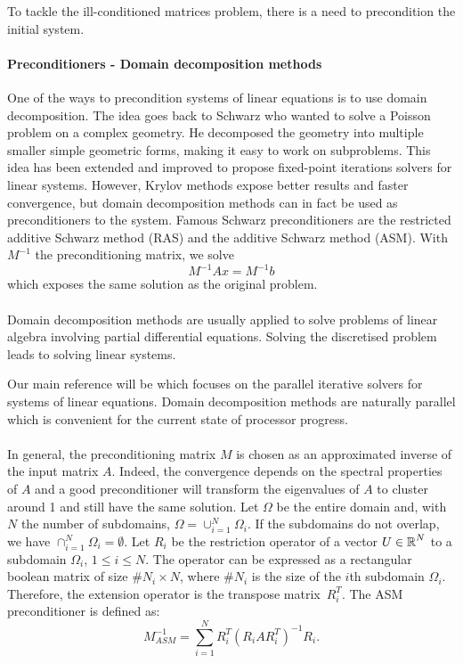 To tackle the ill-conditioned matrices problem, there is a need to precondition the initial system.


\paragraph{Preconditioners - Domain decomposition methods}
One of the ways to precondition systems of linear equations is to use domain decomposition.
The idea goes back to Schwarz \cite{schwarz_grenzuebegang_1870} who wanted to solve a Poisson problem on a complex geometry.
He decomposed the geometry into multiple smaller simple geometric forms, making it easy to work on subproblems.
This idea has been extended and improved to propose fixed-point iterations solvers for linear systems.
However, Krylov methods expose better results and faster convergence, but domain decomposition methods can in fact be used as preconditioners to the system.
Famous Schwarz preconditioners are the restricted additive Schwarz method (RAS) and the additive Schwarz method (ASM).
With \(M^{-1}\) the preconditioning matrix, we solve
\[M^{-1}Ax = M^{-1}b\]
which exposes the same solution as the original problem.

\paragraph{}
Domain decomposition methods are usually applied to solve problems of linear algebra involving partial differential equations.
Solving the discretised problem leads to solving linear systems.

Our main reference will be \cite{dolean_domain_2015} which focuses on the parallel iterative solvers for systems of linear equations.
Domain decomposition methods are naturally parallel which is convenient for the current state of processor progress.

\paragraph{}
In general, the preconditioning matrix \(M\) is chosen as an approximated inverse of the input matrix \(A\).
Indeed, the convergence depends on the spectral properties of \(A\) and a good preconditioner will transform the eigenvalues of \(A\) to cluster around 1 and still have the same solution.
Let \(\Omega\) be the entire domain and, with \(N\) the number of subdomains, \(\Omega = \cup^N_{i=1} \Omega_i\).
If the subdomains do not overlap, we have \(\cap^N_{i=1} \Omega_i = \emptyset\).
Let \(R_i\) be the restriction operator of a vector \(U \in \operatorname{\mathbb{R}}^N\) to a subdomain \(\Omega_i\), \(1 \le i \le N\).
The operator can be expressed as a rectangular boolean matrix of size \(\#N_i \times N\), where \(\#N_i\) is the size of the \(i\)th subdomain \(\Omega_i\).
Therefore, the extension operator is the transpose matrix \(R_i^T\).
The ASM preconditioner is defined as:
\[M^{-1}_{ASM} = \sum^N_{i=1} R_i^T (R_i A R_i^T)^{-1} R_i.\]

